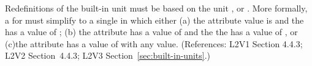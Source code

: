 Redefinitions of the built-in unit  must be based on
the unit ,  or .
More formally, a \UnitDefinition for  must simplify to a
single \Unit in which either (a) the 
attribute value is  and the  has a value of
; (b) the  attribute has a value of
 and the the  has a value of , or (c)the
 attribute has a value of  with
any  value.  (References: L2V1 Section 4.4.3; L2V2
Section~4.4.3; L2V3 Section~\ref{sec:built-in-units}.)
